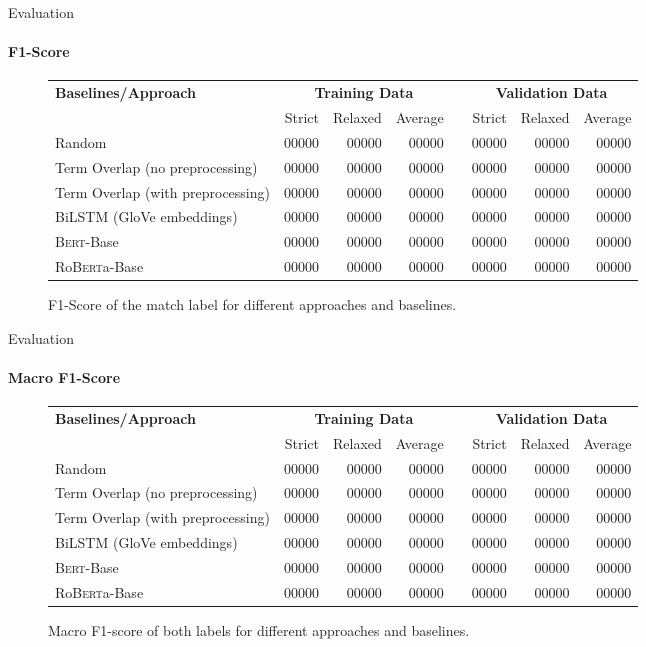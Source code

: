 \documentclass[english,handout]{mlutalk}
\newcommand{\Bert}{\textsc{Bert}\xspace}
\newcommand{\BertBase}{\Bert-Base\xspace}
\newcommand{\Roberta}{\mbox{Ro\textsc{Bert}a}\xspace}
\newcommand{\RobertaBase}{\Roberta-Base\xspace}
\begin{document}
\begin{frame}{Evaluation}
  \framesubtitle{F1-Score}
  \begin{figure}
    \centering
    \caption{F1-Score of the match label for different approaches and baselines.}
    \tiny
    \begin{tabular}{lrrrlrrr}
      \toprule
      \textbf{Baselines/Approach} & \multicolumn{3}{c}{\textbf{Training Data}} & & \multicolumn{3}{c}{\textbf{Validation Data}}\\ \cmidrule{2-4} \cmidrule{6-8}
        & Strict & Relaxed & Average & & Strict & Relaxed & Average\\
      \midrule
      Random 
      & 00000 & 00000 & 00000 & & 00000 & 00000 & 00000 \\
      Term Overlap (no preprocessing)
      & 00000 & 00000 & 00000 & & 00000 & 00000 & 00000 \\
      Term Overlap (with preprocessing)
      & 00000 & 00000 & 00000 & & 00000 & 00000 & 00000 \\
      \midrule
      BiLSTM (GloVe embeddings)
      & 00000 & 00000 & 00000 & & 00000 & 00000 & 00000 \\
      \BertBase
      & 00000 & 00000 & 00000 & & 00000 & 00000 & 00000 \\
      \RobertaBase
      & 00000 & 00000 & 00000 & & 00000 & 00000 & 00000 \\
      \bottomrule
    \end{tabular}
  \end{figure}
\end{frame}

\begin{frame}{Evaluation}
  \framesubtitle{Macro F1-Score}
  \begin{figure}
    \centering
    \caption{Macro F1-score of both labels for different approaches and baselines.}
    \tiny
    \begin{tabular}{lrrrlrrr}
      \toprule
      \textbf{Baselines/Approach} & \multicolumn{3}{c}{\textbf{Training Data}} & & \multicolumn{3}{c}{\textbf{Validation Data}}\\ \cmidrule{2-4} \cmidrule{6-8}
        & Strict & Relaxed & Average & & Strict & Relaxed & Average\\
      \midrule
      Random 
      & 00000 & 00000 & 00000 & & 00000 & 00000 & 00000 \\
      Term Overlap (no preprocessing)
      & 00000 & 00000 & 00000 & & 00000 & 00000 & 00000 \\
      Term Overlap (with preprocessing)
      & 00000 & 00000 & 00000 & & 00000 & 00000 & 00000 \\
      \midrule
      BiLSTM (GloVe embeddings)
      & 00000 & 00000 & 00000 & & 00000 & 00000 & 00000 \\
      \BertBase
      & 00000 & 00000 & 00000 & & 00000 & 00000 & 00000 \\
      \RobertaBase
      & 00000 & 00000 & 00000 & & 00000 & 00000 & 00000 \\
      \bottomrule
    \end{tabular}
  \end{figure}
\end{frame}

\appendix
\section{\appendixname}

\bibliographyframe
\end{document}

